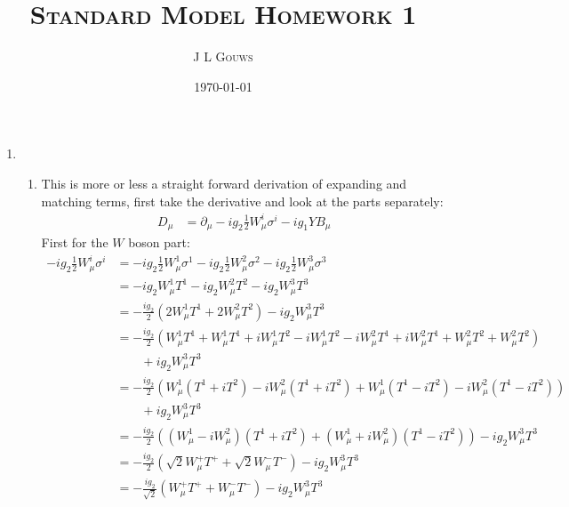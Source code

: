 \documentclass[12pt,a4]{article}
\title{
\textsc{Standard Model Homework 1}
}
\author{\textsc{J L Gouws}
}
\date{\today
\\[1cm]}
\begin{document}
\thispagestyle{empty}

\maketitle

\begin{enumerate}
  \item
    \begin{enumerate}
      \item
        This is more or less a straight forward derivation of expanding and matching terms, first take the derivative and look at the parts separately:
        \begin{align*}
          D_\mu &= \partial_\mu - ig_2 \frac{1}{2} W^i_\mu \sigma^i - i g_1 Y B_\mu
        \end{align*}
        First for the $W$ boson part:
        \begin{align*}
          - ig_2 \frac{1}{2} W^i_\mu \sigma^i &= - ig_2 \frac{1}{2} W^1_\mu \sigma^1 - ig_2 \frac{1}{2} W^2_\mu \sigma^2  - ig_2 \frac{1}{2} W^3_\mu \sigma^3\\
                                              &= - ig_2 W^1_\mu T^1 - ig_2 W^2_\mu T^2  - ig_2  W^3_\mu T^3\\
                                              &= - \frac{ig_2}{2} (2W^1_\mu T^1 + 2W^2_\mu T^2)  - ig_2  W^3_\mu T^3\\
                                              &= - \frac{ig_2}{2} (W^1_\mu T^1 + W^1_\mu T^1 + i W^1_\mu T^2 - i W^1_\mu T^2 - i W^2_\mu T^1  + i W^2_\mu T^1 + W^2_\mu T^2 + W^2_\mu T^2)\\
                                              & \qquad + ig_2  W^3_\mu T^3\\
                                              &= - \frac{ig_2}{2} (W^1_\mu(T^1 + i T^2) - i W^2_\mu(T^1 + i T^2) + W^1_\mu(T^1 - i T^2) - i W^2_\mu(T^1 - i T^2))\\
                                              & \qquad + ig_2  W^3_\mu T^3\\
                                              &= - \frac{ig_2}{2} ((W^1_\mu - i W^2_\mu)(T^1 + i T^2) + (W^1_\mu + i W^2_\mu)(T^1 - i T^2))  - ig_2  W^3_\mu T^3\\
                                              &= - \frac{ig_2}{2} (\sqrt{2}W^+_\mu T^+ + \sqrt{2}W^-_\mu T^-)  - ig_2  W^3_\mu T^3\\
                                              &= - \frac{ig_2}{\sqrt{2}} (W^+_\mu T^+ + W^-_\mu T^-)  - ig_2  W^3_\mu T^3

\end{align*}
\end{enumerate}
\end{enumerate}
\end{document}
